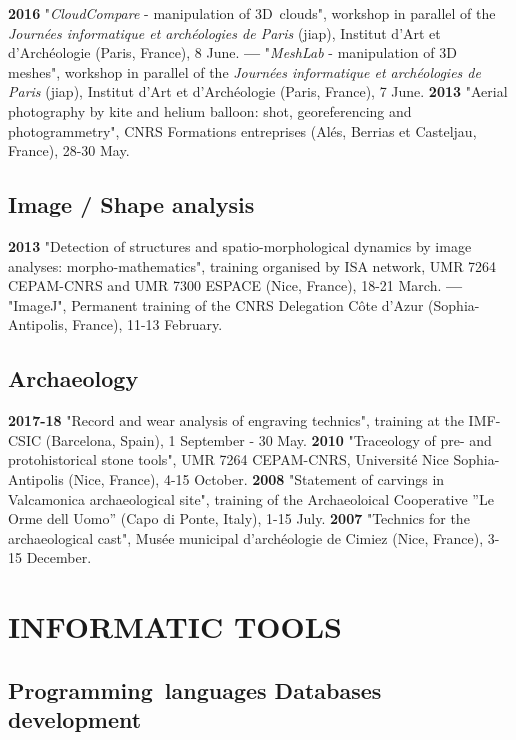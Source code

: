 \documentclass[11pt]{report} %
\begin{document}
\textbf{2016 }"\textit{CloudCompare} - manipulation of 3D~clouds", workshop in parallel of the \textit{Journ\'{e}es informatique et arch\'{e}ologies de Paris} (jiap), Institut d'Art et d'Arch\'{e}ologie (Paris, France), 8 June.
\smallbreak
\textbf{---  }"\textit{MeshLab }- manipulation of 3D\textit{ }meshes", workshop in parallel of the \textit{Journ\'{e}es informatique et arch\'{e}ologies de Paris} (jiap), Institut d'Art et d'Arch\'{e}ologie (Paris, France), 7 June.
\smallbreak
\textbf{2013 }"Aerial photography by kite and helium balloon: shot, georeferencing and photogrammetry", CNRS Formations entreprises (Al\'{e}s, Berrias et Casteljau, France), 28-30 May.

\subsection*{Image / Shape analysis}

\textbf{2013 }"Detection of structures and spatio-morphological dynamics by image analyses: morpho-mathematics", training organised by ISA network, UMR 7264 CEPAM-CNRS and UMR 7300 ESPACE (Nice, France), 18-21 March.
\smallbreak
\textbf{---  }"ImageJ", Permanent training of the CNRS Delegation C\^{o}te d'Azur (Sophia-Antipolis, France), 11-13 February.

\subsection*{Archaeology}

\textbf{2017-18 } "Record and wear analysis of engraving technics", training at the IMF-CSIC (Barcelona, Spain), 1 September - 30 May.
\smallbreak
\textbf{2010 } "Traceology of pre- and protohistorical stone tools", UMR 7264 CEPAM-CNRS, Universit\'{e} Nice Sophia-Antipolis (Nice, France), 4-15 October.
\smallbreak
\textbf{2008 } "Statement of carvings in Valcamonica archaeological site", training of the Archaeoloical Cooperative ''Le Orme dell Uomo'' (Capo di Ponte, Italy), 1-15 July.
\smallbreak
\textbf{2007 } "Technics for the archaeological cast", Mus\'{e}e municipal d'arch\'{e}ologie de Cimiez (Nice, France), 3-15 December.

\section*{INFORMATIC TOOLS}

\subsection*{Programming~languages {\textbar} Databases development}
\end{document}
